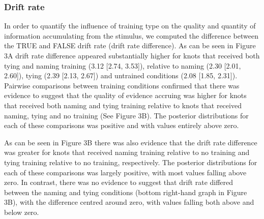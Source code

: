 \documentclass[
  man, donotrepeattitle,floatsintext]{apa6}
\begin{document}
\subsubsection{Drift rate}\label{drift-rate}

In order to quantify the influence of training type on the quality and quantity of information accumulating from the stimulus, we computed the difference between the TRUE and FALSE drift rate (drift rate difference). As can be seen in Figure 3A drift rate difference appeared substantially higher for knots that received both tying and naming training (3.12 {[}2.74, 3.53{]}), relative to naming (2.30 {[}2.01, 2.60{]}), tying (2.39 {[}2.13, 2.67{]}) and untrained conditions (2.08 {[}1.85, 2.31{]}). Pairwise comparisons between training conditions confirmed that there was evidence to suggest that the quality of evidence accruing was higher for knots that received both naming and tying training relative to knots that received naming, tying and no training (See Figure 3B). The posterior distributions for each of these comparisons was positive and with values entirely above zero.

As can be seen in Figure 3B there was also evidence that the drift rate difference was greater for knots that received naming training relative to no training and tying training relative to no training, respectively. The posterior distributions for each of these comparisons was largely positive, with most values falling above zero. In contrast, there was no evidence to suggest that drift rate differed between the naming and tying conditions (bottom right-hand graph in Figure 3B), with the difference centred around zero, with values falling both above and below zero.
\end{document}
